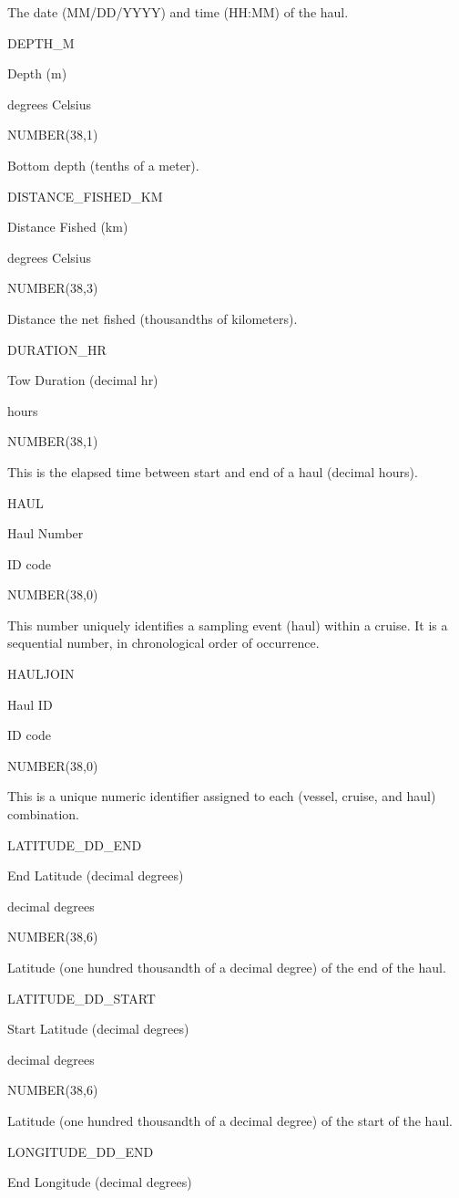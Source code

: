 \documentclass[
  letterpaper,
  oneside,
  open=any]{scrbook}
\begin{document}
The date (MM/DD/YYYY) and time (HH:MM) of the haul.

DEPTH\_M

Depth (m)

degrees Celsius

NUMBER(38,1)

Bottom depth (tenths of a meter).

DISTANCE\_FISHED\_KM

Distance Fished (km)

degrees Celsius

NUMBER(38,3)

Distance the net fished (thousandths of kilometers).

DURATION\_HR

Tow Duration (decimal hr)

hours

NUMBER(38,1)

This is the elapsed time between start and end of a haul (decimal
hours).

HAUL

Haul Number

ID code

NUMBER(38,0)

This number uniquely identifies a sampling event (haul) within a cruise.
It is a sequential number, in chronological order of occurrence.

HAULJOIN

Haul ID

ID code

NUMBER(38,0)

This is a unique numeric identifier assigned to each (vessel, cruise,
and haul) combination.

LATITUDE\_DD\_END

End Latitude (decimal degrees)

decimal degrees

NUMBER(38,6)

Latitude (one hundred thousandth of a decimal degree) of the end of the
haul.

LATITUDE\_DD\_START

Start Latitude (decimal degrees)

decimal degrees

NUMBER(38,6)

Latitude (one hundred thousandth of a decimal degree) of the start of
the haul.

LONGITUDE\_DD\_END

End Longitude (decimal degrees)
\end{document}
